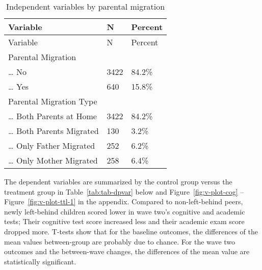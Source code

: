 \documentclass[
  man,floatsintext]{apa7}
\begin{document}
\begin{longtable}[]{@{}lll@{}}
\caption{\label{tab:tab-idpvar}Independent variables by parental migration}\tabularnewline
\toprule()
Variable & N & Percent \\
\midrule()
\endfirsthead
\toprule()
Variable & N & Percent \\
\midrule()
\endhead
Parental Migration & & \\
\ldots{} No & 3422 & 84.2\% \\
\ldots{} Yes & 640 & 15.8\% \\
Parental Migration Type & & \\
\ldots{} Both Parents at Home & 3422 & 84.2\% \\
\ldots{} Both Parents Migrated & 130 & 3.2\% \\
\ldots{} Only Father Migrated & 252 & 6.2\% \\
\ldots{} Only Mother Migrated & 258 & 6.4\% \\
\bottomrule()
\end{longtable}

\newpage

The dependent variables are summarized by the control group versus the treatment group in Table~\ref{tab:tab-dpvar} below and Figure~\ref{fig:v-plot-cog} -- Figure~\ref{fig:v-plot-ttl-1} in the appendix. Compared to non-left-behind peers, newly left-behind children scored lower in wave two's cognitive and academic tests; Their cognitive test score increased less and their academic exam score dropped more. T-tests show that for the baseline outcomes, the differences of the mean values between-group are probably due to chance. For the wave two outcomes and the between-wave changes, the differences of the mean value are statistically significant.
\end{document}
